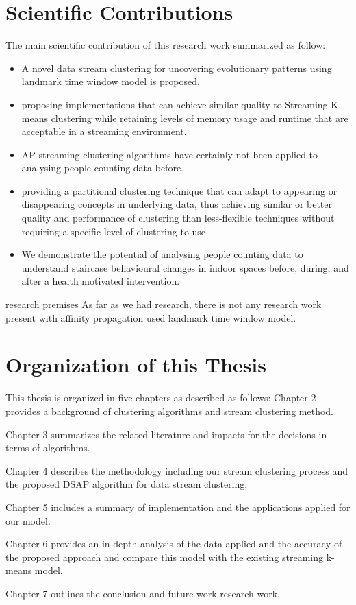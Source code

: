 \documentclass[../UNBThesis2.tex]{subfiles}
\begin{document}
\section{Scientific Contributions}


The main scientific contribution of this research work summarized as follow:

\begin{itemize}
    \item A novel data stream clustering for uncovering evolutionary patterns using landmark time window model is proposed. 
    \item proposing implementations that can achieve similar quality to  Streaming K-means clustering while retaining levels of memory usage and runtime that are acceptable in a streaming environment.
    \item AP streaming clustering algorithms have certainly not been applied to analysing people counting data before.
    \item  providing a partitional clustering technique that can adapt to appearing or disappearing concepts in underlying data, thus achieving similar or better quality and performance of clustering than less-flexible techniques without requiring a specific level of clustering to use
    \item We demonstrate the potential of analysing people counting data to understand staircase behavioural changes in indoor spaces before, during, and after a health motivated intervention.
\end{itemize}


\todo[inline]{}research premises 
As far as we had research, there is not any research work present with affinity propagation used landmark time window model.


\section{Organization of this Thesis}
This thesis is organized in five chapters as described as follows:
Chapter 2 provides a background of clustering algorithms and stream clustering method. 

Chapter 3 summarizes the related literature and impacts for the decisions in terms of algorithms.

Chapter 4 describes the methodology including our stream clustering process and the proposed DSAP algorithm for data stream clustering.

Chapter 5 includes a summary of implementation and the applications applied for our model.

Chapter 6 provides an in-depth analysis of the data applied and the accuracy of the proposed approach and compare this model with the existing streaming k-means model.

Chapter 7 outlines the conclusion and future work research work.
\end{document}

